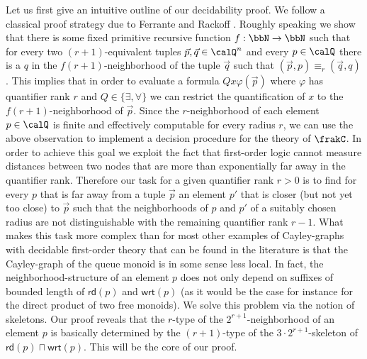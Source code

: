 \documentclass[a4paper,numberwithinsect,USenglish]{lipics-v2018}
\theoremstyle{plain}
\theoremstyle{remark}
\newcommand{\rd}[1]{\mathsf{rd}(#1)}
\newcommand{\wrt}[1]{\mathsf{wrt}(#1)}
\newcommand{\Qx}{\calQ}
\renewcommand{\phi}{\varphi}
\begin{document}
Let us first give an intuitive outline of our decidability proof. We follow a classical proof strategy due to Ferrante and Rackoff \cite{FerR79}. Roughly speaking  we show that there is some fixed primitive recursive function $f:\bbN \to \bbN$ such that for every
two $({r+1})$-equivalent tuples $\vec{p},\vec{q} \in \Qx^n$ and every $p\in \Qx$ there is a $q$ in the $f(r+1)$-neighborhood of the tuple $\vec{q}$ such that $(\vec{p},p) \equiv_r (\vec{q}, q)$.
This implies that in order to evaluate a formula $Qx\phi(\vec{p})$ where $\phi$ has quantifier rank $r$ and $Q\in\{\exists,\forall\}$  we can restrict the quantification of $x$ to the $f(r+1)$-neighborhood of $\vec{p}$. Since the
$r$-neighborhood of each element $p\in \Qx$ is finite and effectively computable for every radius $r$, we can use the above observation to implement a decision procedure for the theory of $\frakC$.   
In order to achieve this goal we exploit the fact that first-order logic cannot measure distances between two nodes that are more than exponentially far away in the quantifier rank. Therefore our task for a given quantifier rank $r>0$ is to find for every $p$ that is far away from a tuple $\vec{p}$ an element $p'$ that is closer (but not yet too close) to $\vec{p}$ such that the neighborhoods of $p$ and $p'$ of a suitably chosen radius are not distinguishable with the remaining quantifier rank $r-1$. What makes this task more complex than for most other examples of Cayley-graphs with decidable first-order theory that can be found in the literature is that the Cayley-graph of the queue monoid is in some sense less local.
In fact, the neighborhood-structure of an element $p$ does not only depend on suffixes of  bounded length of $\rd{p}$ and $\wrt{p}$ (as it would be the case for instance for the direct product of two free monoids). We solve this problem via the notion of skeletons. Our proof 
reveals that   the $r$-type of the $2^{r+1}$-neighborhood of an element $p$ is basically determined by the $(r+1)$-type of the $3\cdot 2^{r+1}$-skeleton of $\rd{p} \sqcap \wrt{p}$. This will be the core
of our proof.
\end{document}
